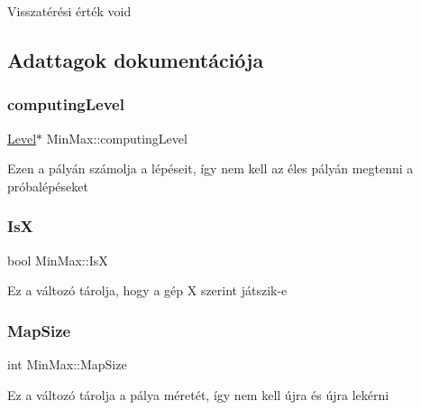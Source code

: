 \begin{DoxyReturn}{Visszatérési érték}
void 
\end{DoxyReturn}


\subsection{Adattagok dokumentációja}
\mbox{\label{class_min_max_a2b1b3631d9cf8c6efec0c7bf16c7d846}} 
\subsubsection{\texorpdfstring{computing\+Level}{computingLevel}}
{\footnotesize\ttfamily \hyperlink{class_level}{Level}$\ast$ Min\+Max\+::computing\+Level\hspace{0.3cm}{\ttfamily [private]}}

Ezen a pályán számolja a lépéseit, így nem kell az éles pályán megtenni a próbalépéseket \mbox{\label{class_min_max_a6da4ca45e19de6c1bdbe8a5a3d4b7da8}} 
\subsubsection{\texorpdfstring{IsX}{IsX}}
{\footnotesize\ttfamily bool Min\+Max\+::\+IsX\hspace{0.3cm}{\ttfamily [private]}}

Ez a változó tárolja, hogy a gép \textquotesingle{}X\textquotesingle{} szerint játszik-\/e \mbox{\label{class_min_max_ab1a2e347bd948d37b96a6694e6ee4a5b}} 
\subsubsection{\texorpdfstring{Map\+Size}{MapSize}}
{\footnotesize\ttfamily int Min\+Max\+::\+Map\+Size\hspace{0.3cm}{\ttfamily [private]}}

Ez a változó tárolja a pálya méretét, így nem kell újra és újra lekérni \mbox{\label{class_min_max_a9bb13756ec099292e262724f16d39a88}} 
